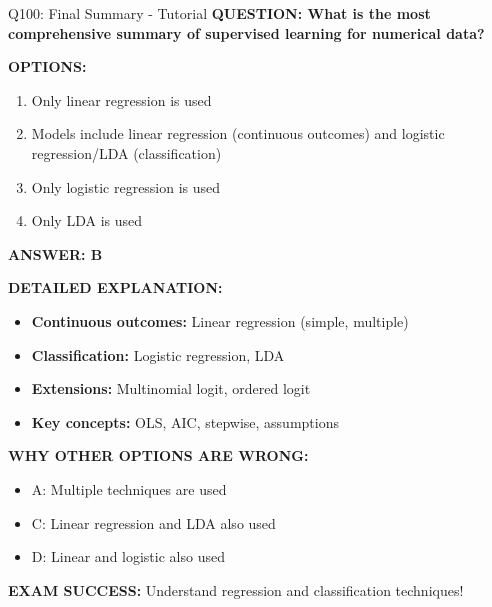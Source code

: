 \documentclass[8pt]{beamer}
\begin{document}
	\begin{frame}{Q100: Final Summary - Tutorial}
		\fontsize{6.5}{7.5}\selectfont
		\textbf{QUESTION: What is the most comprehensive summary of supervised learning for numerical data?}
		
		\vspace{0.1cm}
		\textbf{OPTIONS:}
		\begin{enumerate}
			\item Only linear regression is used
			\item Models include linear regression (continuous outcomes) and logistic regression/LDA (classification)
			\item Only logistic regression is used
			\item Only LDA is used
		\end{enumerate}
		
		\vspace{0.1cm}
		\textcolor{myblue}{\textbf{ANSWER: B}}
		
		\vspace{0.1cm}
		\textbf{DETAILED EXPLANATION:}
		\begin{itemize}
			\item \textbf{Continuous outcomes:} Linear regression (simple, multiple)
			\item \textbf{Classification:} Logistic regression, LDA
			\item \textbf{Extensions:} Multinomial logit, ordered logit
			\item \textbf{Key concepts:} OLS, AIC, stepwise, assumptions
		\end{itemize}
		
		\vspace{0.1cm}
		\textcolor{myred}{\textbf{WHY OTHER OPTIONS ARE WRONG:}}
		\begin{itemize}
			\item \textcolor{myred}{A:} Multiple techniques are used
			\item \textcolor{myred}{C:} Linear regression and LDA also used
			\item \textcolor{myred}{D:} Linear and logistic also used
		\end{itemize}
		
		\textcolor{myred}{\textbf{EXAM SUCCESS:}} Understand \textcolor{myblue}{regression and classification} techniques!
	\end{frame}
	
\end{document}
